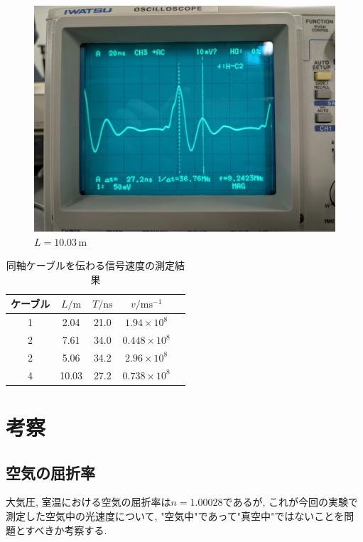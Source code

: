 \documentclass{jarticle}
\begin{document}
\begin{figure}[H]
  \begin{center}
    \includegraphics[scale=0.3]{cable4_result_picture.jpg}
    \caption{$L=10.03\,\mathrm{m}$}
  \end{center}
\end{figure}

\begin{table}[h]
  \centering
  \caption{同軸ケーブルを伝わる信号速度の測定結果}
  \begin{tabular}{ccccc}
    \hline
    ケーブル & $L/\mathrm{m}$ & $T/\mathrm{ns}$ & $v/\mathrm{ms^{-1}}$ \\
    \hline
    1 & 2.04 & 21.0 & $1.94\times10^8$ \\
    2 & 7.61 & 34.0 & $0.448\times10^8$ \\
    2 & 5.06 & 34.2 & $2.96\times10^8$ \\
    4 & 10.03 & 27.2 & $0.738\times10^8$ \\
    \hline
  \end{tabular}
\end{table}



\section{考察}


\subsection{空気の屈折率}

大気圧, 室温における空気の屈折率は$n=1.00028$であるが, これが今回の実験で測定した空気中の光速度について, "空気中"であって"真空中"ではないことを問題とすべきか考察する.
\end{document}
